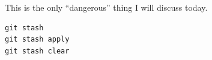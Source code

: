 \documentclass{beamer}
\begin{document}





This is the only ``dangerous'' thing I will discuss today.
\begin{lstlisting}[language=C++]
git stash
git stash apply
git stash clear
\end{lstlisting}
\end{document}
